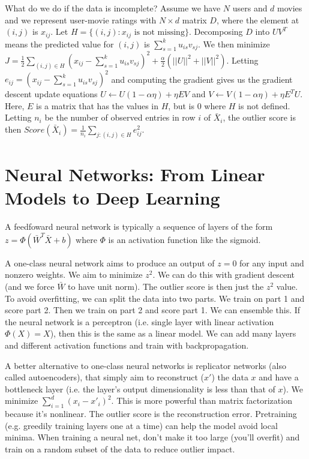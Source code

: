 \documentclass[a4paper]{article}
\begin{document}
What do we do if the data is incomplete? Assume we have $N$ users and $d$ movies
and we represent user-movie ratings with $N \times d$ matrix $D$, where the
element at $(i, j)$ is $x_{ij}$. Let $H = \{(i, j) : x_{ij} \textrm{ is not
missing}\}$. Decomposing $D$ into $UV^T$ means the predicted value for $(i, j)$
is $\sum_{s=1}^{k}{u_{is} v_{sj}}$. We then minimize $J = \frac{1}{2}
\sum_{(i, j) \in H}{(x_{ij} - \sum_{s=1}^{k}{u_{is} v_{sj}})^2}
+ \frac{\alpha}{2}(||U||^2 + ||V||^2)$. Letting $e_{ij} = (x_{ij} -
\sum_{s=1}^{k}{u_{is} v_{sj}})^2$ and computing the gradient gives us the
gradient descent update equations $U \gets U(1- \alpha \eta) + \eta EV$
and $V \gets V(1 - \alpha \eta) + \eta E^T U$. Here, $E$ is a matrix that has
the values in $H$, but is $0$ where $H$ is not defined. Letting $n_i$ be the
number of observed entries in row $i$ of $\bar{X}_i$, the outlier score is
then $Score(\bar{X}_i) = \frac{1}{n_i} \sum_{j:(i, j) \in H}{e_{ij}^2}$.


\section{Neural Networks: From Linear Models to Deep Learning}
A feedfoward neural network is typically a sequence of layers of the form
$z = \Phi(\bar{W}^T \bar{X} + b)$ where $\Phi$ is an activation function like
the sigmoid.

A one-class neural network aims to produce an output of $z = 0$ for any input
and nonzero weights. We aim to minimize $z^2$. We can do this with gradient
descent (and we force $\bar{W}$ to have unit norm). The outlier score is
then just the $z^2$ value. To avoid overfitting, we can split the data into
two parts. We train on part 1 and score part 2. Then we train on part 2 and
score part 1. We can ensemble this. If the neural network is a perceptron
(i.e. single layer with linear activation $\Phi(X) = X$), then this is the
same as a linear model. We can add many layers and different activation
functions and train with backpropagation.

A better alternative to one-class neural networks is replicator networks
(also called autoencoders), that simply aim to reconstruct ($x'$) the data $x$
and have a bottleneck layer (i.e. the layer's output dimensionality is less
than that of $x$). We minimize $\sum_{i=1}^{d}{(x_i - x'_i)^2}$. This is
more powerful than matrix factorization because it's nonlinear. The outlier
score is the reconstruction error. Pretraining (e.g. greedily training layers
one at a time) can help the model avoid local minima. When training a neural
net, don't make it too large (you'll overfit) and train on a random subset
of the data to reduce outlier impact.
\end{document}
